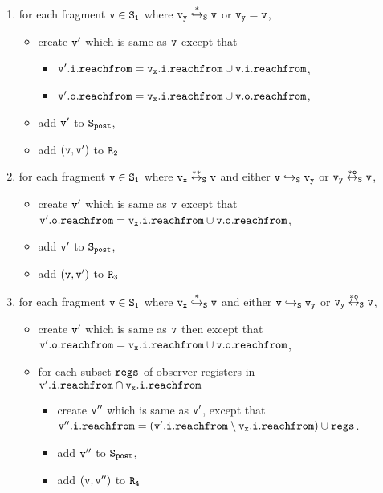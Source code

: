 \begin{itemize}
\begin{enumerate}
\item for each fragment $\tt v \in S_1$ where $\tt v_y \overset{*}\hookrightarrow_S v$ or $\tt v_y = v$, 
\begin{itemize}
	\item create  $\tt v'$ which is same as $\tt v$ except that
\begin{itemize}
 \item $\tt \tt v'.i.reachfrom = v_x.i.reachfrom \cup \tt v.i.reachfrom$, 
\item $\tt \tt v'.o.reachfrom = v_x.i.reachfrom \cup \tt v.o.reachfrom$, 
\end{itemize}
\item add $\tt v'$ to $\tt S_{post}$,
\item add $\tt (v,v')$ to $\tt R_2$
\end{itemize}
\item for each fragment $\tt v \in S_1$ where $\tt v_x \overset{**}\leftrightarrow_S v$ and either $\tt v \hookrightarrow_S v_y$ or $\tt v_y \overset{*o}\leftrightarrow_S v$, 
\begin{itemize}
\item  create $\tt v'$ which is same as $\tt v$ except that $\tt \tt v'.o.reachfrom = v_x.i.reachfrom \cup \tt v.o.reachfrom$, 
 \item add $\tt v'$ to $\tt S_{post}$, 
 \item add $\tt (v,v')$ to $\tt R_3$

\end{itemize}


\item for each fragment $\tt v \in S_1$ where $\tt v_x \overset{*}\hookrightarrow_S v$ and either $\tt v \hookrightarrow_S v_y$ or $\tt v_y \overset{*o}\leftrightarrow_S v$,  
\begin{itemize}
\item create $\tt v'$ which is same as $\tt v$ then except that $\tt \tt v'.o.reachfrom = v_x.i.reachfrom \cup \tt v.o.reachfrom$, 
\item for each subset $\tt regs$ of observer registers in $\tt v'.i.reachfrom \cap \tt v_x.i.reachfrom$
\begin{itemize}
\item create $\tt v''$ which is same as $\tt v'$, except that $\tt v''.i.reachfrom = (\tt v'.i.reachfrom \setminus v_x.i.reachfrom) \cup regs$.
\item add $\tt v''$ to $\tt S_{post}$,
\item add $\tt (v,v'')$ to $\tt R_4$
\end{itemize}
\end{itemize}


\end{enumerate}
\end{itemize}
